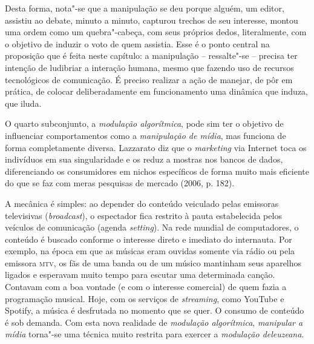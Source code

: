 Desta forma, nota"-se que a manipulação se deu porque alguém, um editor,
assistiu ao debate, minuto a minuto, capturou trechos de seu interesse,
montou uma ordem como um quebra"-cabeça, com seus próprios dedos,
literalmente, com o objetivo de induzir o voto de quem assistia. Esse é
o ponto central na proposição que é feita neste capítulo: a manipulação
-- ressalte"-se -- precisa ter intenção de ludibriar a interação humana,
mesmo que fazendo uso de recursos tecnológicos de comunicação. É preciso
realizar a ação de manejar, de pôr em prática, de colocar
deliberadamente em funcionamento uma dinâmica que induza, que iluda.

O quarto subconjunto, a \emph{modulação algorítmica}, pode sim ter o
objetivo de influenciar comportamentos como a \emph{manipulação de
mídia}, mas funciona de forma completamente diversa. Lazzarato diz que o
\emph{marketing} via Internet toca os indivíduos em sua singularidade e
os reduz a mostras nos bancos de dados, diferenciando os consumidores em
nichos específicos de forma muito mais eficiente do que se faz com meras
pesquisas de mercado (2006, p. 182).

A mecânica é simples: ao depender do conteúdo veiculado pelas emissoras
televisivas (\emph{broadcast}), o espectador fica restrito à pauta
estabelecida pelos veículos de comunicação (agenda \emph{setting}). Na
rede mundial de computadores, o conteúdo é buscado conforme o interesse
direto e imediato do internauta. Por exemplo, na época em que as músicas
eram ouvidas somente via rádio ou pela emissora \textsc{mtv}, os fãs de uma banda
ou de um músico mantinham seus aparelhos ligados e esperavam muito tempo
para escutar uma determinada canção. Contavam com a boa vontade (e com o
interesse comercial) de quem fazia a programação musical. Hoje, com os
serviços de \emph{streaming}, como YouTube e Spotify, a música é
desfrutada no momento que se quer. O consumo de conteúdo é sob demanda.
Com esta nova realidade de \emph{modulação algorítmica}, \emph{manipular
a mídia} torna"-se uma técnica muito restrita para exercer a
\emph{modulação deleuzeana}.

